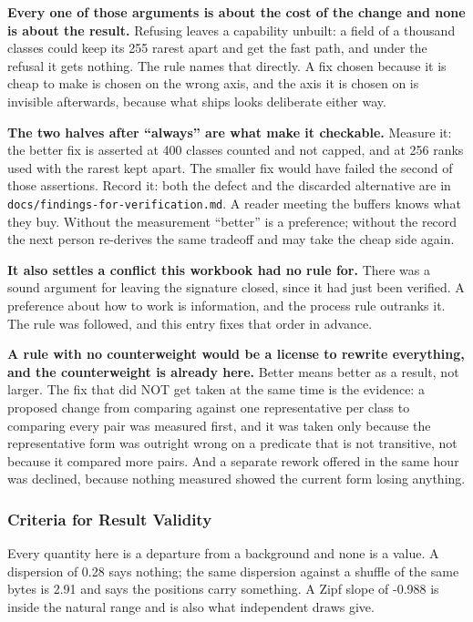 \textbf{Every one of those arguments is about the cost of the change and none is about the result.} Refusing leaves a capability unbuilt: a field of a thousand classes could keep its 255 rarest apart and get the fast path, and under the refusal it gets nothing. The rule names that directly. A fix chosen because it is cheap to make is chosen on the wrong axis, and the axis it is chosen on is invisible afterwards, because what ships looks deliberate either way.

\textbf{The two halves after ``always'' are what make it checkable.} Measure it: the better fix is asserted at 400 classes counted and not capped, and at 256 ranks used with the rarest kept apart. The smaller fix would have failed the second of those assertions. Record it: both the defect and the discarded alternative are in \texttt{docs/\allowbreak{}findings-for-verification.md}. A reader meeting the buffers knows what they buy. Without the measurement ``better'' is a preference; without the record the next person re-derives the same tradeoff and may take the cheap side again.

\textbf{It also settles a conflict this workbook had no rule for.} There was a sound argument for leaving the signature closed, since it had just been verified. A preference about how to work is information, and the process rule outranks it. The rule was followed, and this entry fixes that order in advance.

\textbf{A rule with no counterweight would be a license to rewrite everything, and the counterweight is already here.} Better means better as a result, not larger. The fix that did NOT get taken at the same time is the evidence: a proposed change from comparing against one representative per class to comparing every pair was measured first, and it was taken only because the representative form was outright wrong on a predicate that is not transitive, not because it compared more pairs. And a separate rework offered in the same hour was declined, because nothing measured showed the current form losing anything.

\subsubsection{Criteria for Result Validity}

Every quantity here is a departure from a background and none is a value. A dispersion of 0.28 says nothing; the same dispersion against a shuffle of the same bytes is 2.91 and says the positions carry something. A Zipf slope of -0.988 is inside the natural range and is also what independent draws give.

